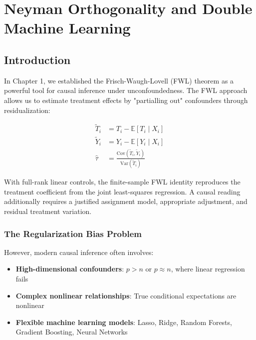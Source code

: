
\chapter{Neyman Orthogonality and Double Machine Learning}
\label{ch:neyman_orthogonality_dml}

\section{Introduction}\label{sec:ch02_introduction}

In Chapter 1, we established the Frisch-Waugh-Lovell (FWL) theorem as a
powerful tool for causal inference under unconfoundedness. The FWL
approach allows us to estimate treatment effects by "partialling out"
confounders through residualization:

\begin{align}
\tilde{T}_i &= T_i - \mathbb{E}[T_i \mid X_i] \\
\tilde{Y}_i &= Y_i - \mathbb{E}[Y_i \mid X_i] \\
\hat{\tau} &= \frac{\text{Cov}(\tilde{T}_i, \tilde{Y}_i)}{\text{Var}(\tilde{T}_i)}
\end{align}

With full-rank linear controls, the finite-sample FWL identity reproduces the treatment coefficient from the joint least-squares regression. A causal reading additionally requires a justified assignment model, appropriate adjustment, and residual treatment variation.

\subsection{The Regularization Bias
Problem}\label{subsec:ch02_regularization_bias}

However, modern causal inference often involves:

\begin{itemize}
\item
  \textbf{High-dimensional confounders}: \(p > n\) or \(p \approx n\),
  where linear regression fails
\item
  \textbf{Complex nonlinear relationships}: True conditional
  expectations are nonlinear
\item
  \textbf{Flexible machine learning models}: Lasso, Ridge, Random
  Forests, Gradient Boosting, Neural Networks
\end{itemize}

